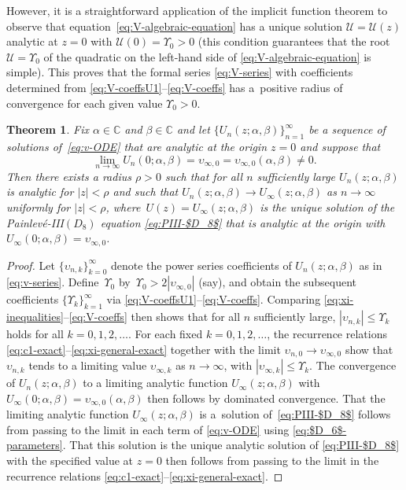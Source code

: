\documentclass[pdftex]{sigma}
\numberwithin{equation}{section}
\newtheorem{Theorem}{Theorem}[section]
\begin{document}
However, it is a straightforward application of the implicit function theorem to observe that equa\-tion~\eqref{eq:V-algebraic-equation} has a unique solution $\mathcal{U}=\mathcal{U}(z)$ analytic at $z=0$ with $\mathcal{U}(0)=\Upsilon_0>0$ (this condition guarantees that the root $\mathcal{U}=\Upsilon_0$ of the quadratic on the left-hand side of \eqref{eq:V-algebraic-equation} is simple). This proves that the formal series \eqref{eq:V-series} with coefficients determined from \eqref{eq:V-coeffsU1}--\eqref{eq:V-coeffs} has a~positive radius of convergence for each given value $\Upsilon_0> 0$.
\begin{Theorem}\label{thm:$D_6$-$D_8$-series}
Fix $\alpha\in\mathbb{C}$ and $\beta\in\mathbb{C}$ and let $\{U_n(z;\alpha,\beta)\}_{n=1}^\infty$ be a sequence of solutions of~\eqref{eq:v-ODE} that are analytic at the origin $z=0$ and suppose that
\[\lim_{n\to\infty}U_n(0;\alpha,\beta)=\upsilon_{\infty,0}=\upsilon_{\infty,0}(\alpha,\beta)\neq 0.\]
 Then there exists a radius $\rho>0$ such that for all $n$ sufficiently large $U_n(z;\alpha,\beta)$ is analytic for $|z|<\rho$ and such that $U_n(z;\alpha,\beta)\to U_\infty(z;\alpha,\beta)$ as $n\to\infty$ uniformly for $|z|<\rho$,
where~${U(z)=U_\infty(z;\alpha,\beta)}$ is the unique solution of the Painlev\'e-{\rm III}$(D_8)$ equation \eqref{eq:PIII-$D_8$}
that is analytic at the origin with $U_\infty(0;\alpha,\beta)=\upsilon_{\infty,0}$.
\end{Theorem}
\begin{proof}
Let $\{\upsilon_{n,k}\}_{k=0}^\infty$ denote the power series coefficients of $U_n(z;\alpha,\beta)$ as in \eqref{eq:v-series}. Define~$\Upsilon_0$ by~$\Upsilon_0>2|\upsilon_{\infty,0}|$ (say), and obtain the subsequent coefficients $\{\Upsilon_k\}_{k=1}^\infty$ via \eqref{eq:V-coeffsU1}--\eqref{eq:V-coeffs}. Comparing \eqref{eq:xi-inequalities}--\eqref{eq:V-coeffs} then shows that for all $n$ sufficiently large,
$|\upsilon_{n,k}|\le \Upsilon_k$ holds for all \linebreak ${k=0,1,2,\dots}$. For each fixed $k=0,1,2,\dots$, the recurrence relations \eqref{eq:c1-exact}--\eqref{eq:xi-general-exact} together with the limit ${\upsilon_{n,0}\to\upsilon_{\infty,0}}$ show that $\upsilon_{n,k}$ tends to a limiting value $\upsilon_{\infty,k}$ as $n\to\infty$, with $|\upsilon_{\infty,k}|\le\Upsilon_k$. The convergence of $U_n(z;\alpha,\beta)$ to a limiting analytic function $U_\infty(z;\alpha,\beta)$ with $U_\infty(0;\alpha,\beta)=\upsilon_{\infty,0}(\alpha,\beta)$ then follows by dominated convergence. That the limiting analytic function $U_\infty(z;\alpha,\beta)$ is a~solution of~\eqref{eq:PIII-$D_8$} follows from passing to the limit in each term of \eqref{eq:v-ODE} using \eqref{eq:$D_6$-parameters}. That this solution is the unique analytic solution of \eqref{eq:PIII-$D_8$} with the specified value at $z=0$ then follows from passing to the limit in the recurrence relations \eqref{eq:c1-exact}--\eqref{eq:xi-general-exact}.
\end{proof}
\end{document}
